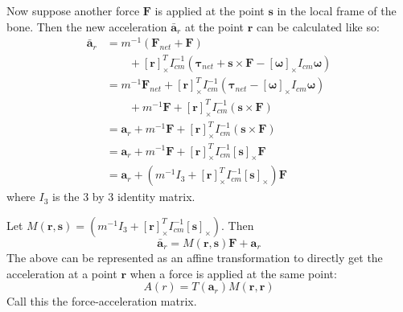 \documentclass[10pt,twocolumn,letterpaper]{article}
\begin{document}
Now suppose another force $\bm{F}$ is applied at the point $\bm{s}$ in the local frame of the bone. Then the new acceleration $\bar{\bm{a}}_r$ at the point $\bm{r}$ can be calculated like so:
\begin{equation}
    \begin{aligned}
        \bar{\bm{a}}_r &= m^{-1} (\bm{F}_{net} + \bm{F}) \\ 
        &\qquad + [\bm{r}]_\times^T I_{cm}^{-1} (\bm{\tau}_{net} + \bm{s} \times \bm{F} - [\bm{\omega}]_\times I_{cm} \bm{\omega}) \\
        &= m^{-1} \bm{F}_{net} + [\bm{r}]_\times^T I_{cm}^{-1} (\bm{\tau}_{net}- [\bm{\omega}]_\times I_{cm} \bm{\omega}) \\
        &\qquad + m^{-1} \bm{F} + [\bm{r}]_\times^T I_{cm}^{-1} (\bm{s} \times \bm{F}) \\
        &= \bm{a}_r + m^{-1} \bm{F} + [\bm{r}]_\times^T I_{cm}^{-1} (\bm{s} \times \bm{F}) \\
        &= \bm{a}_r + m^{-1} \bm{F} + [\bm{r}]_\times^T I_{cm}^{-1} [\bm{s}]_\times \bm{F} \\
        &= \bm{a}_r + (m^{-1} I_3 + [\bm{r}]_\times^T I_{cm}^{-1} [\bm{s}]_\times) \bm{F}
    \end{aligned}
\end{equation}
where $I_3$ is the 3 by 3 identity matrix. 

Let $M(\bm{r}, \bm{s}) = (m^{-1} I_3 + [\bm{r}]_\times^T I_{cm}^{-1} [\bm{s}]_\times)$. Then
\begin{equation}
    \bar{\bm{a}}_r = M(\bm{r}, \bm{s}) \bm{F} + \bm{a}_r
\end{equation}
The above can be represented as an affine transformation to directly get the acceleration at a point $\bm{r}$ when a force is applied at the same point:
\begin{equation}
    A(r) = T(\bm{a}_r) M(\bm{r}, \bm{r}) 
\end{equation}
Call this the force-acceleration matrix.
\end{document}
